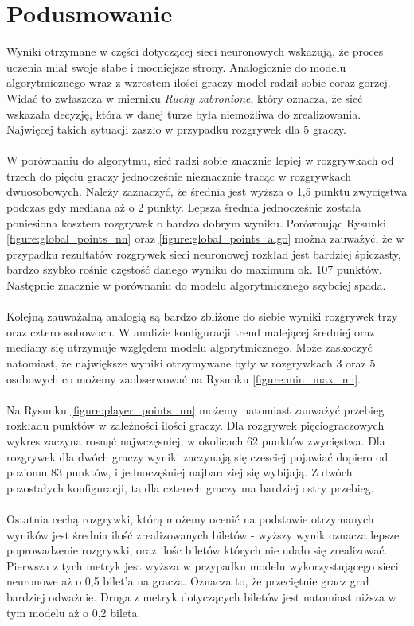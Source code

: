 \documentclass[12pt, oneside]{report}
\begin{document}
\section{Podusmowanie}
Wyniki otrzymane w części dotyczącej sieci neuronowych wskazują, że proces uczenia miał swoje słabe i mocniejsze strony. Analogicznie do modelu algorytmicznego wraz z wzrostem ilości graczy model radził sobie coraz gorzej. Widać to zwłaszcza w mierniku \textit{Ruchy zabronione}, który oznacza, że sieć wskazała decyzję, która w danej turze była niemożliwa do zrealizowania. Najwięcej takich sytuacji zaszło w przypadku rozgrywek dla 5 graczy. \\ \\
W porównaniu do algorytmu, sieć radzi sobie znacznie lepiej w rozgrywkach od trzech do pięciu graczy jednocześnie nieznacznie tracąc w rozgrywkach dwuosobowych. Należy zaznaczyć, że średnia jest wyższa o 1,5 punktu zwycięstwa podczas gdy mediana aż o 2 punkty. Lepsza średnia jednocześnie została poniesiona kosztem rozgrywek o bardzo dobrym wyniku. Porównując Rysunki \ref{figure:global_points_nn} oraz \ref{figure:global_points_algo} można zauważyć, że w przypadku rezultatów rozgrywek sieci neuronowej rozkład jest bardziej śpiczasty, bardzo szybko rośnie częstość danego wyniku do maximum ok. 107 punktów. Następnie znacznie w porównaniu do modelu algorytmicznego szybciej spada. \\ \\
Kolejną zauważalną analogią są bardzo zbliżone do siebie wyniki rozgrywek trzy oraz czteroosobowoch. W analizie konfiguracji trend malejącej średniej oraz mediany się utrzymuje względem modelu algorytmicznego. Może zaskoczyć natomiast, że największe wyniki otrzymywane były w rozgrywkach 3 oraz 5 osobowych co możemy zaobserwować na Rysunku \ref{figure:min_max_nn}. \\ \\
Na Rysunku \ref{figure:player_points_nn} możemy natomiast zauważyć przebieg rozkładu punktów w zależności ilości graczy. Dla rozgrywek pięciograczowych wykres zaczyna rosnąć najwczęsniej, w okolicach 62 punktów zwycięstwa. Dla rozgrywek dla dwóch graczy wyniki zaczynają się czesciej pojawiać dopiero od poziomu 83 punktów, i jednoczęśniej najbardziej się wybijają. Z dwóch pozostałych konfiguracji, ta dla czterech graczy ma bardziej ostry przebieg. \\ \\
Ostatnia cechą rozgrywki, którą możemy ocenić na podstawie otrzymanych wyników jest średnia ilość zrealizowanych biletów - wyższy wynik oznacza lepsze poprowadzenie rozgrywki, oraz ilośc biletów których nie udało się zrealizować. Pierwsza z tych metryk jest wyższa w przypadku modelu wykorzystującego sieci neuronowe aż o 0,5 bilet'a na gracza. Oznacza to, że przeciętnie gracz grał bardziej odważnie. Druga z metryk dotyczących biletów jest natomiast niższa w tym modelu aż o 0,2 bileta. 
\end{document}

